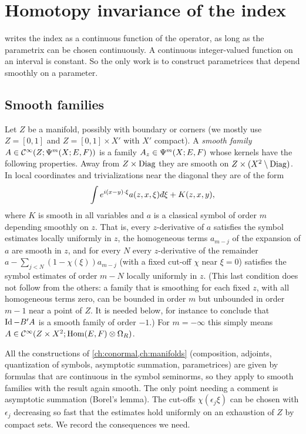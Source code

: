 \section{Homotopy invariance of the index}\label{index:sec:homotopy}

 writes the index as a continuous function of the
operator, as long as the parametrix can be chosen continuously. A continuous
integer-valued function on an interval is constant. So the only work is to
construct parametrices that depend smoothly on a parameter.

\subsection{Smooth families}
Let $Z$ be a manifold, possibly with boundary or corners (we mostly use
$Z=[0,1]$ and $Z=[0,1]\times X'$ with $X'$ compact). A \emph{smooth family}
$A\in\mathcal{C}^\infty(Z;\Psi^{m}(X;E,F))$ is a family $A_z\in\Psi^{m}(X;E,F)$ whose
kernels have the following properties. Away from $Z\times\operatorname{Diag}$ they are
smooth on $Z\times(X^2\setminus\operatorname{Diag})$. In local coordinates and
trivializations near the diagonal they are of the form
\begin{equation*}
  \int e^{i(x-y)\cdot\xi}a(z,x,\xi)\,\dbar\xi+K(z,x,y),
\end{equation*}
where $K$ is smooth in all variables and $a$ is a classical symbol of order
$m$ depending smoothly on $z$. That is, every $z$-derivative of $a$ satisfies
the symbol estimates locally uniformly in $z$, the homogeneous terms
$a_{m-j}$ of the expansion of $a$ are smooth in $z$, and for every $N$ every
$z$-derivative of the remainder $a-\sum_{j<N}(1-\chi(\xi))a_{m-j}$ (with a
fixed cut-off $\chi$ near $\xi=0$) satisfies the symbol estimates of order
$m-N$ locally uniformly in $z$. (This last condition does not follow from the
others: a family that is smoothing for each fixed $z$, with all homogeneous
terms zero, can be bounded in order $m$ but unbounded in order $m-1$ near a
point of $Z$. It is needed below, for instance to conclude that $\operatorname{Id}-B'A$ is
a smooth family of order $-1$.) For $m=-\infty$ this simply means
$A\in\mathcal{C}^\infty(Z\times X^2;\operatorname{Hom}(E,F)\otimes\Omega_R)$.

All the constructions of \cref{ch:conormal,ch:manifolds} (composition,
adjoints, quantization of symbols, asymptotic summation, parametrices) are
given by formulas that are continuous in the symbol seminorms, so they apply
to smooth families with the result again smooth. The only point needing a
comment is asymptotic summation (Borel's lemma). The cut-offs
$\chi(\epsilon_j\xi)$ can be chosen with $\epsilon_j$ decreasing so fast that
the estimates hold uniformly on an exhaustion of $Z$ by compact sets. We
record the consequences we need.


